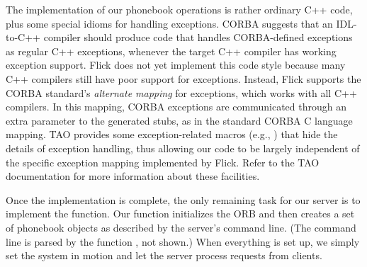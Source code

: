The implementation of our phonebook operations is rather ordinary C++ code,
plus some special idioms for handling exceptions.
%
CORBA suggests that an IDL-to-C++ compiler should produce code that handles
CORBA-defined exceptions as regular C++ exceptions, whenever the target C++
compiler has working exception support.  Flick does not yet implement this code
style because many C++ compilers still have poor support for exceptions.
Instead, Flick supports the CORBA standard's \emph{alternate mapping} for
exceptions, which works with all C++ compilers.  In this mapping, CORBA
exceptions are communicated through an extra 
parameter to the generated stubs, as in the standard CORBA C language mapping.
%
TAO provides some exception-related macros (e.g., ) that
hide the details of exception handling, thus allowing our code to be largely
independent of the specific exception mapping implemented by Flick.  Refer to
the TAO documentation for more information about these facilities.

Once the  implementation is complete, the only remaining task
for our server is to implement the  function.  Our
 function initializes the ORB and then creates a set of
phonebook objects as described by the server's command line.  (The command line
is parsed by the function , not shown.)  When everything
is set up, we simply set the system in motion and let the server process
requests from clients.

